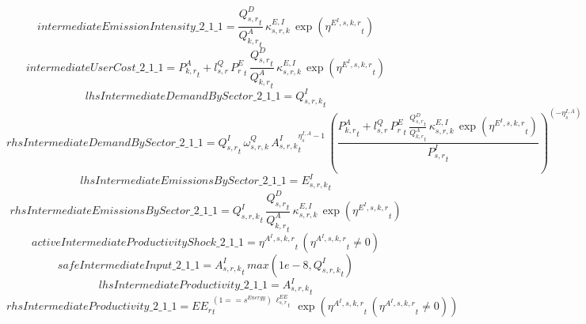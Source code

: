 \begin{dmath*}
intermediateEmissionIntensity\_2\_1\_1 = \frac{{{Q^{D}_{s,r}}}_{t}}{{{Q^{A}_{k,r}}}_{t}}\, {{\kappa^{E,I}_{s,r,k}}}\, \exp\left({{\eta^{E^{I},s,k,r}}}_{t}\right)
\end{dmath*}
\begin{dmath*}
intermediateUserCost\_2\_1\_1 = {{P^{A}_{k,r}}}_{t}+{{l^{Q}_{s,r}}}\, {{P^E_r}}_{t}\, \frac{{{Q^{D}_{s,r}}}_{t}}{{{Q^{A}_{k,r}}}_{t}}\, {{\kappa^{E,I}_{s,r,k}}}\, \exp\left({{\eta^{E^{I},s,k,r}}}_{t}\right)
\end{dmath*}
\begin{dmath*}
lhsIntermediateDemandBySector\_2\_1\_1 = {{Q^{I}_{s,r,k}}}_{t}
\end{dmath*}
\begin{dmath*}
rhsIntermediateDemandBySector\_2\_1\_1 = {{Q^{I}_{s,r}}}_{t}\, {{\omega^{Q}_{s,r,k}}}\, {{A^{I}_{s,r,k}}}_{t}^{{{\eta^{I,A}_{s}}}-1}\, \left(\frac{{{P^{A}_{k,r}}}_{t}+{{l^{Q}_{s,r}}}\, {{P^E_r}}_{t}\, \frac{{{Q^{D}_{s,r}}}_{t}}{{{Q^{A}_{k,r}}}_{t}}\, {{\kappa^{E,I}_{s,r,k}}}\, \exp\left({{\eta^{E^{I},s,k,r}}}_{t}\right)}{{{P^{I}_{s,r}}}_{t}}\right)^{\left(-{{\eta^{I,A}_{s}}}\right)}
\end{dmath*}
\begin{dmath*}
lhsIntermediateEmissionsBySector\_2\_1\_1 = {{E^I_{s,r,k}}}_{t}
\end{dmath*}
\begin{dmath*}
rhsIntermediateEmissionsBySector\_2\_1\_1 = {{Q^{I}_{s,r,k}}}_{t}\, \frac{{{Q^{D}_{s,r}}}_{t}}{{{Q^{A}_{k,r}}}_{t}}\, {{\kappa^{E,I}_{s,r,k}}}\, \exp\left({{\eta^{E^{I},s,k,r}}}_{t}\right)
\end{dmath*}
\begin{dmath*}
activeIntermediateProductivityShock\_2\_1\_1 = {{\eta^{A^{I},s,k,r}}}_{t}\, \left({{\eta^{A^{I},s,k,r}}}_{t}\neq 0\right)
\end{dmath*}
\begin{dmath*}
safeIntermediateInput\_2\_1\_1 = {{A^{I}_{s,r,k}}}_{t}\, max(1e-8,{{Q^{I}_{s,r,k}}}_{t})
\end{dmath*}
\begin{dmath*}
lhsIntermediateProductivity\_2\_1\_1 = {{A^{I}_{s,r,k}}}_{t}
\end{dmath*}
\begin{dmath*}
rhsIntermediateProductivity\_2\_1\_1 = {{EE_r}}_{t}^{\left(1=={{s^{Energy}}}\right)\, {{\ell^{EE}_{s,r}}}_{t}}\, \exp\left({{\eta^{A^{I},s,k,r}}}_{t}\, \left({{\eta^{A^{I},s,k,r}}}_{t}\neq 0\right)\right)
\end{dmath*}
